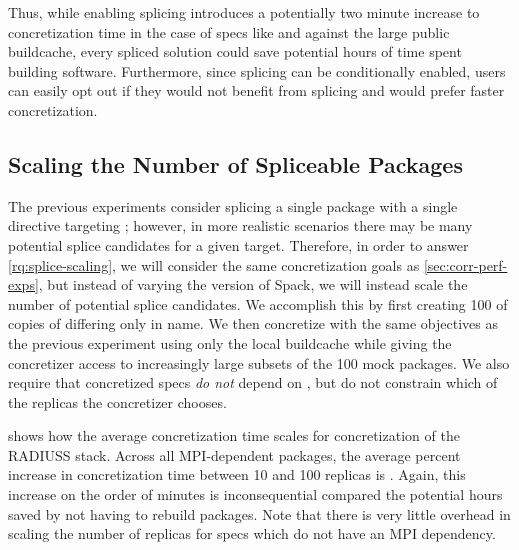 Thus, while enabling splicing introduces a potentially two minute increase to
concretization time in the case of specs like  and 
against the large public buildcache, every spliced solution could save potential
hours of time spent building software. Furthermore, since splicing can be
conditionally enabled, users can easily opt out if they would not benefit from
splicing and would prefer faster concretization.
 
\subsection{Scaling the Number of Spliceable Packages}
\label{sec:scaling}
The previous experiments consider splicing a single package
with a single  directive targeting ;
however, in more realistic scenarios there may be many potential splice
candidates for a given target. Therefore, in order to answer
\ref{rq:splice-scaling}, we will consider the same concretization goals as
\cref{sec:corr-perf-exps}, but instead of varying the version of Spack, we will
instead scale the number of potential splice candidates. We accomplish this by
first creating 100 of copies of  differing only in name. We then
concretize with the same objectives as the previous experiment using only the
local buildcache while giving the concretizer access to increasingly large
subsets of the 100 mock packages. We also require that concretized specs
\emph{do not} depend on , but do not constrain which of the replicas
the concretizer chooses.

 shows how the average concretization time scales for
concretization of the RADIUSS stack. Across all MPI-dependent packages, the
average percent increase in concretization time between 10 and 100 replicas is
\scalingpercentincrease{}. Again, this increase on the order of minutes is
inconsequential compared the potential hours saved by not having to rebuild
packages. Note that there is very little overhead in scaling the number of
replicas for specs which do not have an MPI dependency.


